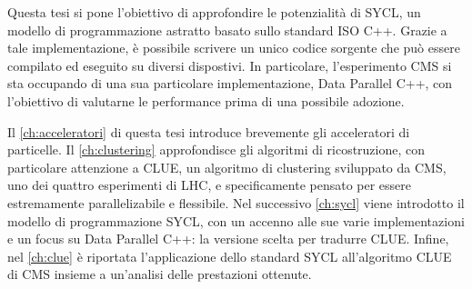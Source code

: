 \documentclass[12pt,a4paper]{report}
\begin{document}
Questa tesi si pone l'obiettivo di approfondire le potenzialità di SYCL, un modello di programmazione astratto basato sullo standard ISO C++. Grazie a tale implementazione, è possibile scrivere un unico codice sorgente che può essere compilato ed eseguito su diversi dispostivi. In particolare, l'esperimento CMS si sta occupando di una sua particolare implementazione, Data Parallel C++, con l'obiettivo di valutarne le performance prima di una possibile adozione. 

Il \autoref{ch:acceleratori} di questa tesi introduce brevemente gli acceleratori di particelle. Il \autoref{ch:clustering} approfondisce gli algoritmi di ricostruzione, con particolare attenzione a CLUE, un algoritmo di clustering sviluppato da CMS, uno dei quattro esperimenti di LHC, e specificamente pensato per essere estremamente parallelizabile e flessibile. Nel successivo \autoref{ch:sycl} viene introdotto il modello di programmazione SYCL, con un accenno alle sue varie implementazioni e un focus su Data Parallel C++: la versione scelta per tradurre CLUE. Infine, nel \autoref{ch:clue} è riportata l'applicazione dello standard SYCL all'algoritmo CLUE di CMS insieme a un'analisi delle prestazioni ottenute.












\end{document}

